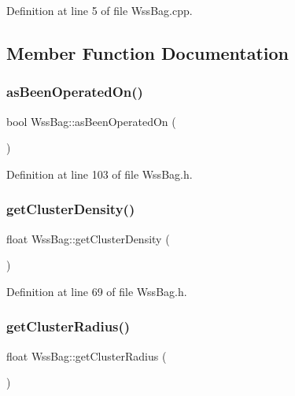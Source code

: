 Definition at line 5 of file Wss\+Bag.\+cpp.



\subsection{Member Function Documentation}
\mbox{\label{class_wss_bag_aa806ac9a3dd391c3a0579db62babb380}} 
\subsubsection{\texorpdfstring{as\+Been\+Operated\+On()}{asBeenOperatedOn()}}
{\footnotesize\ttfamily bool Wss\+Bag\+::as\+Been\+Operated\+On (\begin{DoxyParamCaption}{ }\end{DoxyParamCaption})\hspace{0.3cm}{\ttfamily [inline]}}



Definition at line 103 of file Wss\+Bag.\+h.

\mbox{\label{class_wss_bag_a1f785231b3bb2d7737bed7022a46b4e6}} 
\subsubsection{\texorpdfstring{get\+Cluster\+Density()}{getClusterDensity()}}
{\footnotesize\ttfamily float Wss\+Bag\+::get\+Cluster\+Density (\begin{DoxyParamCaption}{ }\end{DoxyParamCaption})\hspace{0.3cm}{\ttfamily [inline]}}



Definition at line 69 of file Wss\+Bag.\+h.

\mbox{\label{class_wss_bag_ad81f1788775aa9c340d2f215b267e7e8}} 
\subsubsection{\texorpdfstring{get\+Cluster\+Radius()}{getClusterRadius()}}
{\footnotesize\ttfamily float Wss\+Bag\+::get\+Cluster\+Radius (\begin{DoxyParamCaption}{ }\end{DoxyParamCaption})\hspace{0.3cm}{\ttfamily [inline]}}



